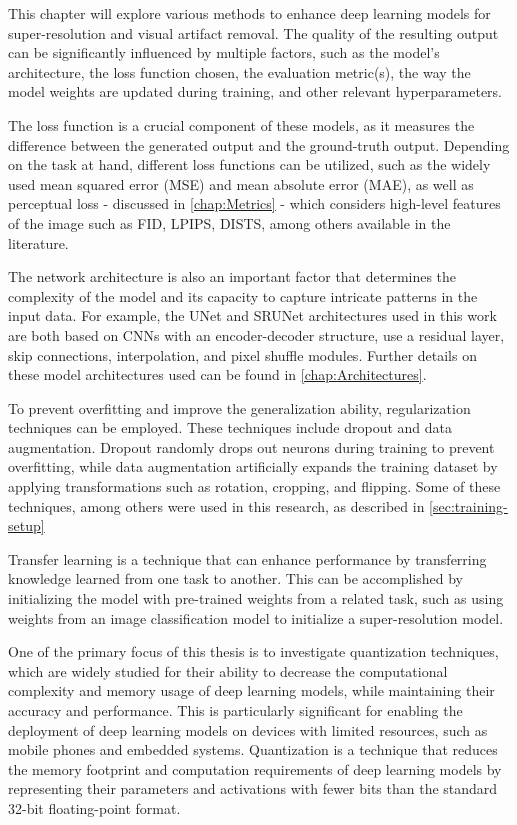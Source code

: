\label{chap:Optimizations}

This chapter will explore various methods to enhance deep learning models for super-resolution and visual artifact removal. The quality of the resulting output can be significantly influenced by multiple factors, such as the model's architecture, the loss function chosen, the evaluation metric(s), the way the model weights are updated during training, and other relevant hyperparameters.

The loss function is a crucial component of these models, as it measures the difference between the generated output and the ground-truth output. Depending on the task at hand, different loss functions can be utilized, such as the widely used mean squared error (MSE) and mean absolute error (MAE), as well as perceptual loss - discussed in \cref{chap:Metrics} - which considers high-level features of the image such as FID, LPIPS, DISTS, among others available in the literature.

The network architecture is also an important factor that determines the complexity of the model and its capacity to capture intricate patterns in the input data. For example, the UNet and SRUNet architectures used in this work are both based on CNNs with an encoder-decoder structure, use a residual layer, skip connections, interpolation, and pixel shuffle modules. Further details on these model architectures used can be found in \cref{chap:Architectures}.

To prevent overfitting and improve the generalization ability, regularization techniques can be employed. These techniques include dropout and data augmentation. Dropout randomly drops out neurons during training to prevent overfitting, while data augmentation artificially expands the training dataset by applying transformations such as rotation, cropping, and flipping. Some of these techniques, among others were used in this research, as described in \cref{sec:training-setup}

Transfer learning is a technique that can enhance performance by transferring knowledge learned from one task to another. This can be accomplished by initializing the model with pre-trained weights from a related task, such as using weights from an image classification model to initialize a super-resolution model.

One of the primary focus of this thesis is to investigate quantization techniques, which are widely studied for their ability to decrease the computational complexity and memory usage of deep learning models, while maintaining their accuracy and performance. This is particularly significant for enabling the deployment of deep learning models on devices with limited resources, such as mobile phones and embedded systems. Quantization is a technique that reduces the memory footprint and computation requirements of deep learning models by representing their parameters and activations with fewer bits than the standard 32-bit floating-point format.

